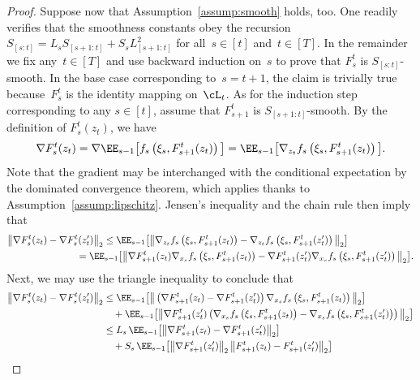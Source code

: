 \documentclass[11pt]{article}
\begin{document}
\begin{proof}
Suppose now that Assumption~\ref{assump:smooth} holds, too. One readily verifies that the smoothness constants obey the recursion $S_{[s:t]} =  L_sS_{[s+1:t]} + S_s L_{[s+1:t]}^2$ for all~$s\in[t]$ and~$t\in[T]$. In the remainder we fix any~$t\in[T]$ and use backward induction on~$s$ to prove that $F_s^t$ is $S_{[s:t]}$-smooth. In the base case corresponding to~$s=t+1$, the claim is trivially true because~$F_s^t$ is the identity mapping on~$\cL_t$. As for the induction step corresponding to any $s\in[t]$, assume that $F_{s+1}^t$ is $S_{[s+1:t]}$-smooth. By the definition of $F_{s}^t(z_t)$, we have
\begin{align*}
    \nabla F_{s}^t(z_t)= \nabla \EE_{s-1} \big[ f_s\left(\xi_s,F_{s+1}^t(z_t)\right)\big]= \EE_{s-1} \big[ \nabla_{z_t} f_s\left(\xi_s,F_{s+1}^t(z_t)\right)\big].
\end{align*}
Note that the gradient may be interchanged with the conditional expectation by the dominated convergence theorem, which applies thanks to Assumption~\ref{assump:lipschitz}. Jensen's inequality and the chain rule then imply that
\begin{align*}
    & \big\| \nabla F_{s}^t(z_t) - \nabla F_{s}^t(z_t^\prime)\big\|_2  \leq \EE_{s-1} \big[\big\| \nabla_{z_t} f_s\left(\xi_s,F_{s+1}^t(z_t)\right)-\nabla_{z_t} f_s\left(\xi_s,F_{s+1}^t(z_t^\prime)\right) \big\|_2\big]\\
    & \hspace{2.5cm} = \EE_{s-1} \big[\big\| \nabla F_{s+1}^t(z_t)  \nabla_{x_s} f_s\left(\xi_s,F_{s+1}^t(z_t)\right) -\nabla F_{s+1}^t(z_t^\prime) \nabla_{x_s} f_s\left(\xi_s,F_{s+1}^t(z_t^\prime)\right) \big\|_2\big].
\end{align*}
Next, we may use the triangle inequality to conclude that
\begin{align*}
    \big\| \nabla F_{s}^t(z_t) - \nabla F_{s}^t(z_t^\prime)\big\|_2 & \leq \EE_{s-1} \big[ \big\| \left(\nabla  F_{s+1}^t(z_t) -\nabla  F_{s+1}^t(z_t^\prime)\right) \nabla_{x_s}  f_s\left(\xi_s,F_{s+1}^t(z_t)\right) \big\|_2 \big]\\
    & \quad +\EE_{s-1} \big[ \big\| \nabla  F_{s+1}^t(z_t^\prime) \left(\nabla_{x_s}  f_s\left(\xi_s,F_{s+1}^t(z_t)\right) -  \nabla_{x_s}  f_s\left(\xi_s,F_{s+1}^t(z_t^\prime)\right) \right)\big\|_2 \big]\\
    & \leq L_s\, \EE_{s-1} \big[ \big\|\nabla  F_{s+1}^t(z_t) -\nabla  F_{s+1}^t(z_t^\prime) \big\|_2 \big] \\
    &\quad + S_s \, \EE_{s-1} \big[ \big\|\nabla F_{s+1}^t(z_t^\prime) \big\|_2\,  \big\|F_{s+1}^t(z_t) - F_{s+1}^t(z_t^\prime) \big\|_2 \big] \\

\end{align*}
\end{proof}
\end{document}
